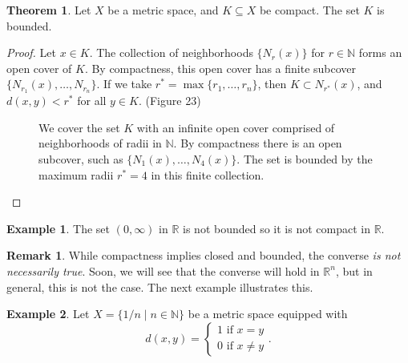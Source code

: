 \documentclass{article}
\newcommand{\N}{\mathbb{N}}
\newcommand{\R}{\mathbb{R}}
\theoremstyle{definition}
\newtheorem{theorem}{Theorem}[section]
\newtheorem{example}{Example}[section]
\newtheorem{remark}{Remark}[section]
\begin{document}
\begin{theorem}
	Let $ X $ be a metric space, and $ K\subseteq X $ be compact. The set $ K $ is bounded. 
\end{theorem}
\begin{proof}
Let $ x\in K $. The collection of neighborhoods $ \{N_r(x)\} $ for $ r\in\N $ forms an open cover of $ K $. By compactness, this open cover has a finite subcover $ \{N_{r_1}(x),\ldots,N_{r_n}\} $. If we take $ r^*=\max\{r_1,\ldots,r_n\} $, then $ K\subset N_{r^*}(x) $, and $ d(x,y)<r^* $ for all $ y\in K $. (Figure 23)
  \begin{figure}[h]
	\centering
	\caption{We cover the set $ K $ with an infinite open cover comprised of neighborhoods of radii in $ \N $. By compactness there is an open subcover, such as $ \{N_1(x),\ldots,N_4(x)\} $. The set is bounded by the maximum radii $ r^*=4 $ in this finite collection.}  
\end{figure}
\end{proof}
\begin{example}
The set $ (0,\infty) $ in $ \R $ is not bounded so it is not compact in $ \R $. 
\end{example}
\begin{remark}
	While compactness implies closed and bounded, the converse \textit{is not necessarily true}. Soon, we will see that the converse will hold in $ \R^n $, but in general, this is not the case. The next example illustrates this.
\end{remark}
\begin{example}
	Let $ X=\{1/n\mid n\in\N\} $ be a metric space equipped with $$ d(x,y)=\begin{cases}
	1\text{ if }x=y\\0\text{ if }x\neq y
	\end{cases}.$$
\end{example}
\end{document}
